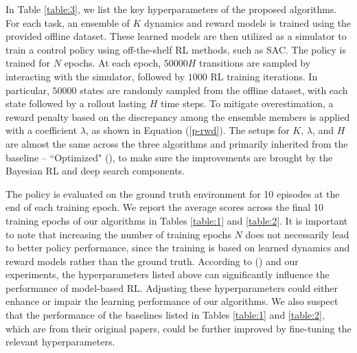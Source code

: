 In Table \ref{table:3}, we list the key hyperparameters of the proposed algorithms. For each task, an ensemble of $K$ dynamics and reward models is trained using the provided offline dataset. These learned models are then utilized as a simulator to train a control policy using off-the-shelf RL methods, such as SAC. The policy is trained for $N$ epochs. At each epoch, $50000H$ transitions are sampled by interacting with the simulator, followed by $1000$ RL training iterations. In particular, $50000$ states are randomly sampled from the offline dataset, with each state followed by a rollout lasting $H$ time steps. To mitigate overestimation, a reward penalty based on the discrepancy among the ensemble members is applied with a coefficient $\lambda$, as shown in Equation (\ref{p-rwd}). The setups for $K$, $\lambda$, and $H$ are almost the same across the three algorithms and primarily inherited from the baseline -- ``Optimized" (\cite{DBLP:conf/iclr/LuBPOR22}), to make sure the improvements are brought by the Bayesian RL and deep search components.

The policy is evaluated on the ground truth environment for 10 episodes at the end of each training epoch. We report the average scores across the final 10 training epochs of our algorithms in Tables \ref{table:1} and \ref{table:2}. It is important to note that increasing the number of training epochs $N$ does not necessarily lead to better policy performance, since the training is based on learned dynamics and reward models rather than the ground truth. 
According to (\cite{DBLP:conf/iclr/LuBPOR22}) and our experiments, the hyperparameters listed above can significantly influence the performance of model-based RL. Adjusting these hyperparameters could either enhance or impair the learning performance of our algorithms. We also suspect that the performance of the baselines listed in Tables \ref{table:1} and \ref{table:2}, which are from their original papers, could be further improved by fine-tuning the relevant hyperparameters. 

